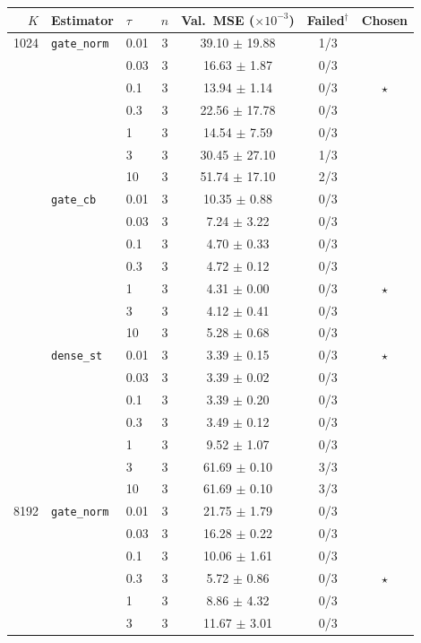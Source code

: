 \begin{tabular}{rllcccc}
\toprule
$K$ & Estimator & $\tau$ & $n$ & Val.\ MSE ($\times 10^{-3}$) & Failed$^\dagger$ & Chosen \\
\midrule
1024 & \texttt{gate\_norm} & 0.01 & 3 & 39.10 $\pm$ 19.88 & 1/3 &  \\
 &  & 0.03 & 3 & 16.63 $\pm$ 1.87 & 0/3 &  \\
 &  & 0.1 & 3 & 13.94 $\pm$ 1.14 & 0/3 & $\star$ \\
 &  & 0.3 & 3 & 22.56 $\pm$ 17.78 & 0/3 &  \\
 &  & 1 & 3 & 14.54 $\pm$ 7.59 & 0/3 &  \\
 &  & 3 & 3 & 30.45 $\pm$ 27.10 & 1/3 &  \\
 &  & 10 & 3 & 51.74 $\pm$ 17.10 & 2/3 &  \\
 & \texttt{gate\_cb} & 0.01 & 3 & 10.35 $\pm$ 0.88 & 0/3 &  \\
 &  & 0.03 & 3 & 7.24 $\pm$ 3.22 & 0/3 &  \\
 &  & 0.1 & 3 & 4.70 $\pm$ 0.33 & 0/3 &  \\
 &  & 0.3 & 3 & 4.72 $\pm$ 0.12 & 0/3 &  \\
 &  & 1 & 3 & 4.31 $\pm$ 0.00 & 0/3 & $\star$ \\
 &  & 3 & 3 & 4.12 $\pm$ 0.41 & 0/3 &  \\
 &  & 10 & 3 & 5.28 $\pm$ 0.68 & 0/3 &  \\
 & \texttt{dense\_st} & 0.01 & 3 & 3.39 $\pm$ 0.15 & 0/3 & $\star$ \\
 &  & 0.03 & 3 & 3.39 $\pm$ 0.02 & 0/3 &  \\
 &  & 0.1 & 3 & 3.39 $\pm$ 0.20 & 0/3 &  \\
 &  & 0.3 & 3 & 3.49 $\pm$ 0.12 & 0/3 &  \\
 &  & 1 & 3 & 9.52 $\pm$ 1.07 & 0/3 &  \\
 &  & 3 & 3 & 61.69 $\pm$ 0.10 & 3/3 &  \\
 &  & 10 & 3 & 61.69 $\pm$ 0.10 & 3/3 &  \\
\midrule
8192 & \texttt{gate\_norm} & 0.01 & 3 & 21.75 $\pm$ 1.79 & 0/3 &  \\
 &  & 0.03 & 3 & 16.28 $\pm$ 0.22 & 0/3 &  \\
 &  & 0.1 & 3 & 10.06 $\pm$ 1.61 & 0/3 &  \\
 &  & 0.3 & 3 & 5.72 $\pm$ 0.86 & 0/3 & $\star$ \\
 &  & 1 & 3 & 8.86 $\pm$ 4.32 & 0/3 &  \\
 &  & 3 & 3 & 11.67 $\pm$ 3.01 & 0/3 &  \\

\end{tabular}
